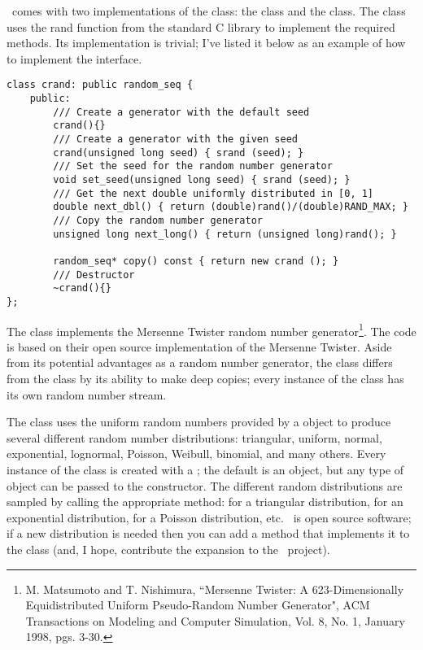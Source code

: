 \adevs\ comes with two implementations of the  class: the  class and the  class. The  class uses the rand function from the standard C library to implement the required methods. Its implementation is trivial; I've listed it below as an example of how to implement the  interface.
\begin{verbatim}
class crand: public random_seq {
    public:
        /// Create a generator with the default seed
        crand(){}
        /// Create a generator with the given seed
        crand(unsigned long seed) { srand (seed); }
        /// Set the seed for the random number generator
        void set_seed(unsigned long seed) { srand (seed); }
        /// Get the next double uniformly distributed in [0, 1]
        double next_dbl() { return (double)rand()/(double)RAND_MAX; } 
        /// Copy the random number generator
        unsigned long next_long() { return (unsigned long)rand(); }

        random_seq* copy() const { return new crand (); }
        /// Destructor
        ~crand(){}
};
\end{verbatim}
The  class implements the Mersenne Twister random number generator\footnote{M. Matsumoto and T. Nishimura, ``Mersenne Twister: A 623-Dimensionally Equidistributed Uniform Pseudo-Random Number Generator", ACM Transactions on Modeling and Computer Simulation, Vol. 8, No. 1, January 1998, pgs. 3-30.}. The code is based on their open source implementation of the Mersenne Twister. Aside from its potential advantages as a random number generator, the  class differs from the  class by its ability to make deep copies; every instance of the  class has its own random number stream.

The  class uses the uniform random numbers provided by a  object to produce several different random number distributions: triangular, uniform, normal, exponential, lognormal, Poisson, Weibull, binomial, and many others. Every instance of the  class is created with a ; the default is an  object, but any type of  object can be passed to the  constructor. The different random distributions are sampled by calling the appropriate method:  for a triangular distribution,  for an exponential distribution,  for a Poisson distribution, etc. \adevs\ is open source software; if a new distribution is needed then you can add a method that implements it to the  class (and, I hope, contribute the expansion to the \adevs\ project).
